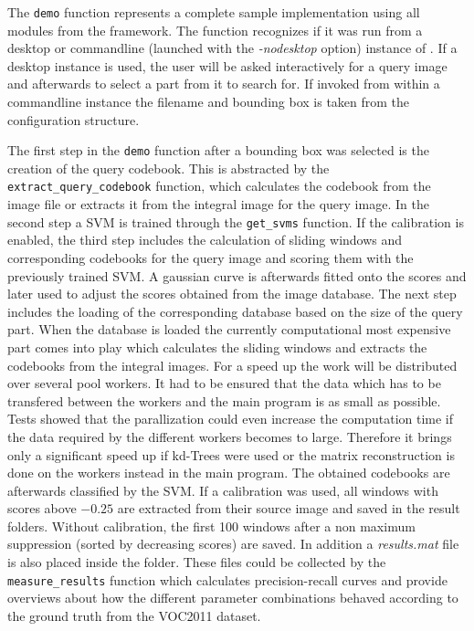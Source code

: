 The \verb|demo| function represents a complete sample implementation using all modules from the framework. The function recognizes if it was run from a desktop or commandline (launched with the \textit{-nodesktop} option) instance of \MATLAB. If a desktop instance is used, the user will be asked interactively for a query image and afterwards to select a part from it to search for. If invoked from within a commandline instance the filename and bounding box is taken from the configuration structure.

The first step in the \verb|demo| function after a bounding box was selected is the creation of the query codebook. This is abstracted by the \verb|extract_query_codebook| function, which calculates the codebook from the image file or extracts it from the integral image for the query image. In the second step a \ac{SVM} is trained through the \verb|get_svms| function. If the calibration is enabled, the third step includes the calculation of sliding windows and corresponding codebooks for the query image and scoring them with the previously trained \ac{SVM}. A gaussian curve is afterwards fitted onto the scores and later used to adjust the scores obtained from the image database. The next step includes the loading of the corresponding database based on the size of the query part. When the database is loaded the currently computational most expensive part comes into play which calculates the sliding windows and extracts the codebooks from the integral images. For a speed up the work will be distributed over several pool workers. It had to be ensured that the data which has to be transfered between the workers and the main program is as small as possible. Tests showed that the parallization could even increase the computation time if the data required by the different workers becomes to large. Therefore it brings only a significant speed up if kd-Trees were used or the matrix reconstruction is done on the workers instead in the main program. The obtained codebooks are afterwards classified by the \ac{SVM}. If a calibration was used, all windows with scores above $-0.25$ are extracted from their source image and saved in the result folders. Without calibration, the first 100 windows after a non maximum suppression (sorted by decreasing scores) are saved. In addition a \textit{results.mat} file is also placed inside the folder. These files could be collected by the \verb|measure_results| function which calculates precision-recall curves and provide overviews about how the different parameter combinations behaved according to the ground truth from the \ac{VOC2011} dataset.


